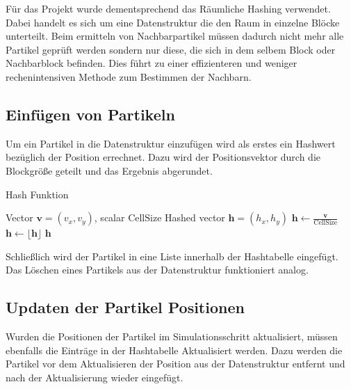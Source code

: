 \documentclass[a4paper, 12pt]{article}
\begin{document}
Für das Projekt wurde dementsprechend das Räumliche Hashing verwendet. Dabei handelt es sich um eine Datenstruktur die den Raum in einzelne Blöcke unterteilt. Beim ermitteln von Nachbarpartikel müssen dadurch nicht mehr alle Partikel geprüft werden sondern nur diese, die sich in dem selbem Block oder Nachbarblock befinden. Dies führt zu einer effizienteren und weniger rechenintensiven Methode zum Bestimmen der Nachbarn.

\subsection{Einfügen von Partikeln}
Um ein Partikel in die Datenstruktur einzufügen wird als erstes ein Hashwert bezüglich der Position errechnet. Dazu wird der Positionsvektor durch die Blockgröße geteilt und das Ergebnis abgerundet.
\begin{algorithm}[H]
	\caption{Hash Funktion}
	\begin{algorithmic}[1]
		\Require Vector $\mathbf{v} = (v_x, v_y)$, scalar $\text{CellSize}$
		\Ensure Hashed vector $\mathbf{h} = (h_x, h_y)$
		\State $\mathbf{h} \leftarrow \frac{\mathbf{v}}{\text{CellSize}}$
		\State $\mathbf{h} \leftarrow \lfloor \mathbf{h} \rfloor$
		\Return $\mathbf{h}$
	\end{algorithmic}
\end{algorithm}

Schließlich wird der Partikel in eine Liste innerhalb der Hashtabelle eingefügt. Das Löschen eines Partikels aus der Datenstruktur funktioniert analog.

\subsection{Updaten der Partikel Positionen}
Wurden die Positionen der Partikel im Simulationsschritt aktualisiert, müssen ebenfalls die Einträge in der Hashtabelle Aktualisiert werden. Dazu werden die Partikel vor dem Aktualisieren der Position aus der Datenstruktur entfernt und nach der Aktualisierung wieder eingefügt. 
\end{document}
